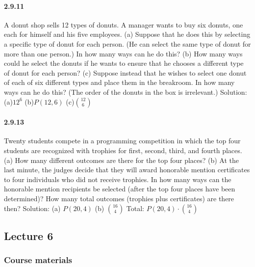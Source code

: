 \documentclass{article}
\begin{document}
\paragraph{2.9.11}
A donut shop sells 12 types of donuts. A manager wants to buy six donuts, one
each for himself and his five employees.\newline
(a) Suppose that he does this by selecting a specific type of donut for each person.
(He can select the same type of donut for more than one person.) In how many
ways can he do this?\newline
(b) How many ways could he select the donuts if he wants to ensure that he chooses
a different type of donut for each person?\newline
(c) Suppose instead that he wishes to select one donut of each of six different types
and place them in the breakroom. In how many ways can he do this? (The order
of the donuts in the box is irrelevant.)\newline
Solution:\newline
(a)$12^6$\newline
(b)$P(12,6)$\newline
(c)$\binom{12}{6}$
\paragraph{2.9.13}
Twenty students compete in a programming competition in which the top four
students are recognized with trophies for first, second, third, and fourth places.\newline
(a) How many different outcomes are there for the top four places?\newline
(b) At the last minute, the judges decide that they will award honorable mention
certificates to four individuals who did not receive trophies. In how many ways
can the honorable mention recipients be selected (after the top four places have
been determined)? How many total outcomes (trophies plus certificates) are there
then?\newline
Solution:\newline
(a) $P(20,4)$\newline
(b) $\binom{16}{4}$ Total: $P(20,4)\cdot \binom{16}{4}$
\subsection{Lecture 6}
\subsubsection{Course materials}
\end{document}
